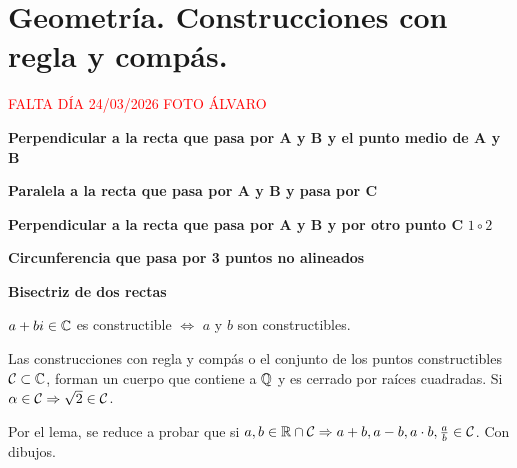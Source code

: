 \chapter{Geometr\'ia. Construcciones con regla y comp\'as.}
\textcolor{red}{FALTA D\'IA 24/03/2026 FOTO \'ALVARO}

\textbf{Perpendicular a la recta que pasa por A y B y el punto medio de A y B}

\textbf{Paralela a la recta que pasa por A y B y pasa por C}

\textbf{Perpendicular a la recta que pasa por A y B y por otro punto C} $1\circ 2$

\textbf{Circunferencia que pasa por 3 puntos no alineados}

\textbf{Bisectriz de dos rectas}
\begin{lem} $a+bi \in \mathbb{C}$ es constructible $\iff$ $a$ y $b$ son constructibles. 
    \end{lem}\begin{teo}
    Las construcciones con regla y comp\'as o el conjunto de los puntos constructibles $\mathcal{C} \subset \mathbb{C}$, forman un cuerpo que contiene a $\mathbb{Q}$ y es cerrado por ra\'ices cuadradas. Si $\alpha \in \mathcal{C} \Rightarrow \sqrt{2} \in \mathcal{C}$. 
\end{teo}
\begin{dem}
    Por el lema, se reduce a probar que si $a,b\in \mathbb{R} \cap \mathcal{C} \Rightarrow a+b, a-b, a\cdot b, \frac{a}{b} \in \mathcal{C}$. Con dibujos.
\end{dem}

